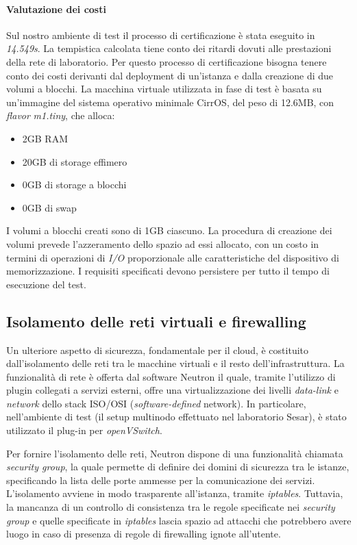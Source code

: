 \documentclass[../main.tex]{subfiles}
\begin{document}
\paragraph{Valutazione dei costi}
Sul nostro ambiente di test il processo di certificazione è stata eseguito in \textit{14.549s}. La tempistica calcolata tiene conto dei ritardi dovuti alle prestazioni della rete di laboratorio.
Per questo processo di certificazione bisogna tenere conto dei costi derivanti dal deployment di un'istanza e dalla creazione di due volumi a blocchi.
La macchina virtuale utilizzata in fase di test è basata su un'immagine del sistema operativo minimale CirrOS, del peso di 12.6MB, con \textit{flavor} \textit{m1.tiny}, che alloca:
\begin{itemize}
\item 2GB RAM
\item 20GB di storage effimero
\item 0GB di storage a blocchi
\item 0GB di swap
\end{itemize}

I volumi a blocchi creati sono di 1GB ciascuno. La procedura di creazione dei volumi prevede l'azzeramento dello spazio ad essi allocato, con un costo in termini di operazioni di \textit{I/O} proporzionale alle caratteristiche del dispositivo di memorizzazione.
I requisiti specificati devono persistere per tutto il tempo di esecuzione del test.

\subsection{Isolamento delle reti virtuali e firewalling}
Un ulteriore aspetto di sicurezza, fondamentale per il cloud, è costituito dall'isolamento delle reti tra le macchine virtuali e il resto dell'infrastruttura.
La funzionalità di rete è offerta dal software Neutron il quale, tramite l'utilizzo di plugin collegati a servizi esterni, offre una virtualizzazione dei livelli \textit{data-link} e \textit{network} dello stack ISO/OSI (\textit{software-defined} network).
In particolare, nell'ambiente di test (il setup multinodo effettuato nel laboratorio Sesar), è stato utilizzato il plug-in per \textit{openVSwitch}.

Per fornire l'isolamento delle reti, Neutron dispone di una funzionalità chiamata \textit{security group}, la quale permette di definire dei domini di sicurezza tra le istanze, specificando la lista delle porte ammesse per la comunicazione dei servizi.
L'isolamento avviene in modo trasparente all'istanza, tramite \textit{iptables}. Tuttavia, la mancanza di un controllo di consistenza tra le regole specificate nei \textit{security group} e quelle specificate in \textit{iptables} lascia spazio ad attacchi che potrebbero avere luogo in caso di presenza di regole di firewalling ignote all'utente.
\end{document}
